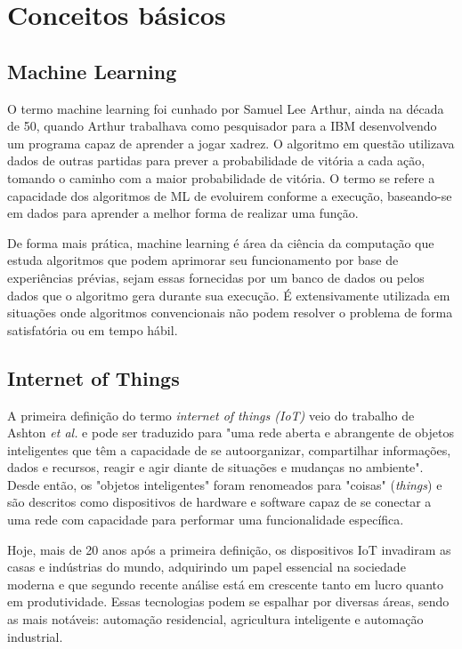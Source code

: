 \documentclass[12pt]{article}
\begin{document}
\section{Conceitos básicos}

\subsection{Machine Learning}

O termo machine learning foi cunhado por Samuel Lee Arthur, ainda na década de 50, quando Arthur trabalhava como pesquisador para a IBM desenvolvendo um programa capaz de aprender a jogar xadrez. O algoritmo em questão utilizava dados de outras partidas para prever a probabilidade de vitória a cada ação, tomando o caminho com a maior probabilidade de vitória. O termo se refere a capacidade dos algoritmos de ML de evoluirem conforme a execução, baseando-se em dados para aprender a melhor forma de realizar uma função. 

De forma mais prática, machine learning é área da ciência da computação que estuda algoritmos que podem aprimorar seu funcionamento por base de experiências prévias, sejam essas fornecidas por um banco de dados ou pelos dados que o algoritmo gera durante sua execução. É extensivamente utilizada em situações onde algoritmos convencionais não podem resolver o problema de forma satisfatória ou em tempo hábil.

\subsection{Internet of Things}

A primeira definição do termo \emph{internet of things (IoT)} veio do trabalho de Ashton \emph{et al.} e pode ser traduzido para "uma rede aberta e abrangente de objetos inteligentes que têm a capacidade de se autoorganizar, compartilhar informações, dados e recursos, reagir e agir diante de situações e mudanças no ambiente". Desde então, os "objetos inteligentes" foram renomeados para "coisas" (\emph{things}) e são descritos como dispositivos de hardware e software capaz de se conectar a uma rede com capacidade para performar uma funcionalidade específica. 

Hoje, mais de 20 anos após a primeira definição, os dispositivos IoT invadiram as casas e indústrias do mundo, adquirindo um papel essencial na sociedade moderna e que segundo recente análise \cite{analisis} está em crescente tanto em lucro quanto em produtividade. Essas tecnologias podem se espalhar por diversas áreas, sendo as mais notáveis: automação residencial, agricultura inteligente e automação industrial.
\end{document}
